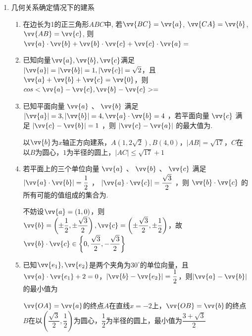 \begin{enumerate}
    \item 几何关系确定情况下的建系
    \begin{enumerate}
        \item 在边长为1的正三角形$ABC$中, 若$\vv{BC}=\vv{a}$, $\vv{CA}=\vv{b}$, $\vv{AB}=\vv{c}$, 则$\vv{a}\cdot\vv{b}+\vv{b}\cdot\vv{c}+\vv{c}\cdot\vv{a}=$
        \item 已知向量$\vv{a}, \vv{b}, \vv{c}$满足$|\vv{a}| = |\vv{b}| = 1, |\vv{c}| = \sqrt{2}$，且$\vv{a} + \vv{b} + \vv{c} = \vv{0}$，则$cos<\vv{a} - \vv{c}, \vv{b} - \vv{c}> = $ 
        \item 已知平面向量 $\vv{a}$ 、 $\vv{b}$ 满足 $\left| \vv{a}\right|  = 3,\left| \vv{b}\right|  = 4,\vv{a} \cdot  \vv{b} = 4$ ，若平面向量 $\vv{c}$ 满足 $\left| {\vv{c} - \vv{b}}\right|  = 1$ ，则 $\left| {\vv{c} - \vv{a}}\right|$ 的最大值为.
        \begin{jieda}
            以$\vv{b}$为$x$轴正方向建系，$A(1, 2\sqrt{2}), B(4, 0)$，$|AB| = \sqrt{17}$，$C$在以$B$为圆心，$1$为半径的圆上，$|AC| \leq \sqrt{17} + 1$
        \end{jieda}
        \item 若平面上的三个单位向量 $\vv{a}$ 、 $\vv{b}$ 、 $\vv{c}$ 满足 $\left| {\vv{a} \cdot  \vv{b}}\right|  = \dfrac{1}{2}$ ， $\left| {\vv{a} \cdot  \vv{c}}\right|  = \dfrac{\sqrt{3}}{2}$ ，则 $\vv{b} \cdot  \vv{c}$ 的所有可能的值组成的集合为.
        \begin{jieda}
            不妨设$\vv{a} = (1, 0)$，则$\vv{b} = \left(\pm \dfrac{1}{2}, \pm \dfrac{\sqrt{3}}{2}\right), \vv{c} = \left(\pm \dfrac{\sqrt{3}}{2}, \pm \dfrac{1}{2}\right)$，故$\vv{b} \cdot  \vv{c} \in \left\{  {0,\dfrac{\sqrt{3}}{2}, - \dfrac{\sqrt{3}}{2}}\right\}$
        \end{jieda}

        \item 已知$\vv{e_1}, \vv{e_2}$是两个夹角为$30^{\circ}$的单位向量，且$\vv{a} \cdot \vv{e_1} + 2 = 0$，$|\vv{b} - \vv{e_2}| = \dfrac{1}{2}$，则$|\vv{a} - \vv{b}|$的最小值为
        \begin{jieda}
            $\vv{OA} = \vv{a}$的终点$A$在直线$x = -2$上，$\vv{OB} = \vv{b}$的终点$B$在以$\left(\dfrac{\sqrt{3}}{2}, \dfrac{1}{2}\right)$为圆心，$\dfrac{1}{2}$为半径的圆上，最小值为$\dfrac{3+\sqrt{3}}{2}$
        \end{jieda} 
        

\end{enumerate}
\end{enumerate}
